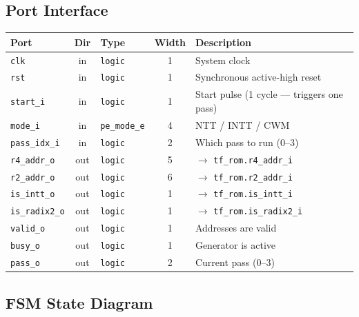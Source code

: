 \documentclass[11pt,a4paper]{article}
\newcommand{\sv}[1]{\texttt{#1}}
\newcommand{\port}[1]{\texttt{#1}}
\begin{document}
\subsection{Port Interface}

\begin{center}
\renewcommand{\arraystretch}{1.3}
\begin{tabular}{lclcp{7cm}}
  \toprule
  \textbf{Port} & \textbf{Dir} & \textbf{Type} & \textbf{Width} & \textbf{Description} \\
  \midrule
  \port{clk}          & in  & \sv{logic}    & 1  & System clock \\
  \port{rst}          & in  & \sv{logic}    & 1  & Synchronous active-high reset \\
  \port{start\_i}     & in  & \sv{logic}    & 1  & Start pulse (1 cycle --- triggers one pass) \\
  \port{mode\_i}      & in  & \sv{pe\_mode\_e}& 4 & NTT / INTT / CWM \\
  \port{pass\_idx\_i} & in  & \sv{logic}    & 2  & Which pass to run (0--3) \\
  \midrule
  \port{r4\_addr\_o}  & out & \sv{logic}    & 5  & $\to$ \port{tf\_rom.r4\_addr\_i} \\
  \port{r2\_addr\_o}  & out & \sv{logic}    & 6  & $\to$ \port{tf\_rom.r2\_addr\_i} \\
  \port{is\_intt\_o}  & out & \sv{logic}    & 1  & $\to$ \port{tf\_rom.is\_intt\_i} \\
  \port{is\_radix2\_o}& out & \sv{logic}    & 1  & $\to$ \port{tf\_rom.is\_radix2\_i} \\
  \port{valid\_o}     & out & \sv{logic}    & 1  & Addresses are valid \\
  \port{busy\_o}      & out & \sv{logic}    & 1  & Generator is active \\
  \port{pass\_o}      & out & \sv{logic}    & 2  & Current pass (0--3) \\
  \bottomrule
\end{tabular}
\end{center}

\subsection{FSM State Diagram}
\end{document}
